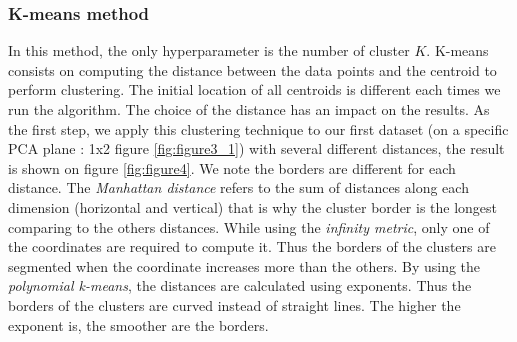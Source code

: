 \subsubsection{K-means method}
In this method, the only hyperparameter is the number of cluster $K$. K-means consists on computing the distance between the data points and the centroid to perform clustering. The initial location of all centroids is different each times we run the algorithm. The choice of the distance has an impact on the results. 
As the first step, we apply this clustering technique to our first dataset (on a specific PCA plane : 1x2  figure \ref{fig:figure3_1}) with several different distances, the result is shown on figure \ref{fig:figure4}. 
We note the borders are different for each distance. The \emph{Manhattan distance} refers to the sum of distances along each dimension (horizontal and vertical) that is why the cluster border is the longest comparing to the others distances. While using the \emph{infinity metric}, only one of the coordinates are required to compute it. Thus the borders of the clusters are segmented when the coordinate increases more than the others. By using the \emph{polynomial k-means}, the distances are calculated using exponents. Thus the borders of the clusters are curved instead of straight lines. The higher the exponent is, the smoother are the borders. 

